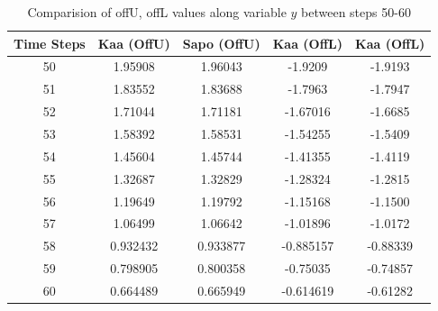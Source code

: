 \documentclass[EPiC]{easychair}
\begin{document}

\begin{table}[hbt!]
\centering
\begin{tabular}{|c|c|c|c|c|}
    \hline
    Time Steps & Kaa (OffU) & Sapo (OffU) & Kaa (OffL) & Kaa (OffL)  \\
    \hline
    50 & 1.95908 & 1.96043  & -1.9209 & -1.9193 \\
    \hline
    51 & 1.83552 & 1.83688  & -1.7963 & -1.7947 \\
    \hline
    52 & 1.71044 & 1.71181  & -1.67016 & -1.6685 \\
    \hline
    53 & 1.58392 & 1.58531  & -1.54255 & -1.5409 \\
    \hline
    54 & 1.45604 & 1.45744  & -1.41355 & -1.4119 \\
    \hline
    55 & 1.32687 & 1.32829  & -1.28324 & -1.2815\\
    \hline
    56 & 1.19649 & 1.19792  & -1.15168 & -1.1500\\
    \hline
    57 & 1.06499 & 1.06642  & -1.01896 & -1.0172 \\
    \hline
    58 & 0.932432 & 0.933877 & -0.885157 & -0.88339 \\
    \hline
    59 & 0.798905 & 0.800358  & -0.75035 &  -0.74857 \\
    \hline
    60 & 0.664489 & 0.665949  & -0.614619 & -0.61282\\
    \hline
\end{tabular}
\caption{Comparision of offU, offL values along variable $y$ between steps 50-60}
\label{val2}
\end{table}
\end{document}
